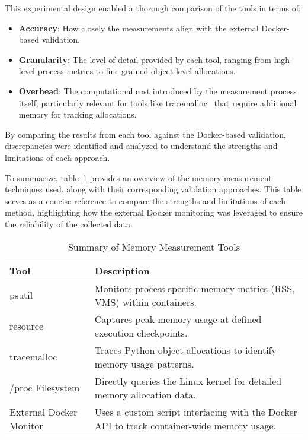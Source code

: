 This experimental design enabled a thorough comparison of the tools in terms of:

\begin{itemize}
    \item \textbf{Accuracy}:
    How closely the measurements align with the external Docker-based validation.

    \item \textbf{Granularity}:
    The level of detail provided by each tool, ranging from high-level process metrics to fine-grained object-level allocations.

    \item \textbf{Overhead}:
    The computational cost introduced by the measurement process itself, particularly relevant for tools like tracemalloc~\cite{tracemalloc} that require additional memory for tracking allocations.
\end{itemize}

By comparing the results from each tool against the Docker-based validation, discrepancies were identified and analyzed to understand the strengths and limitations of each approach.

To summarize, table~\ref{tab:mmc-memory-measurement-tools} provides an overview of the memory measurement techniques used, along with their corresponding validation approaches.
This table serves as a concise reference to compare the strengths and limitations of each method, highlighting how the external Docker monitoring was leveraged to ensure the reliability of the collected data.

\begin{table}[h]
    \centering
    \begin{tabular}{|l|p{7cm}|}
        \hline
        \textbf{Tool}                       & \textbf{Description}                                                                       \\ \hline
        psutil~\cite{psutil}                & Monitors process-specific memory metrics (\ac{RSS}, \ac{VMS}) within containers.           \\ \hline
        resource~\cite{importlib_resources} & Captures peak memory usage at defined execution checkpoints.                               \\ \hline
        tracemalloc~\cite{tracemalloc}      & Traces Python object allocations to identify memory usage patterns.                        \\ \hline
        /proc Filesystem~\cite{procfs}      & Directly queries the Linux kernel for detailed memory allocation data.                     \\ \hline
        External Docker Monitor             & Uses a custom script interfacing with the Docker API to track container-wide memory usage. \\ \hline
    \end{tabular}
    \caption{Summary of Memory Measurement Tools}
    \label{tab:mmc-memory-measurement-tools}
\end{table}

